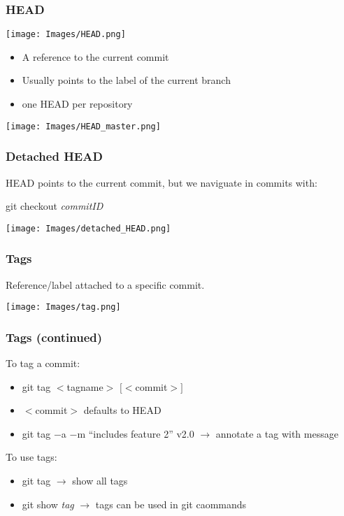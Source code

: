 \documentclass{beamer}
\begin{document}
	\begin{frame}[plain]
		\frametitle{HEAD}
		\begin{center}
			\texttt{[image: Images/HEAD.png]}
		\end{center}

		\begin{itemize}
			\item A reference to the current commit 
			\item Usually points to the label of the current branch
			\item one HEAD per repository
		\end{itemize}
		
		\begin{center}
			\texttt{[image: Images/HEAD\_master.png]}
		\end{center}
	\end{frame}

	\begin{frame}[plain]
		\frametitle{Detached HEAD}
		HEAD points to the current commit, but we naviguate in commits with:
		\begin{center}
			git checkout \textit{commitID}
		\end{center}
		\begin{center}
			\texttt{[image: Images/detached\_HEAD.png]}
		\end{center}
	
	\end{frame}

	\begin{frame}[plain]
		\frametitle{Tags}
		Reference/label attached to a specific commit.
		\begin{center}
			\texttt{[image: Images/tag.png]}
		\end{center}
		
	\end{frame}

	\begin{frame}[plain]
		\frametitle{Tags (continued)}
		
		To tag a commit:
		\begin{itemize}
			\item git tag $<$tagname$>$ $[<$commit$>]$
			\item $<$commit$>$ defaults to HEAD
			\item git tag $-$a $-$m ``includes feature 2'' v2.0 $\rightarrow$ annotate a tag with message
		\end{itemize}
		To use tags:
		\begin{itemize}
			\item git tag $\rightarrow$ show all tags
			\item git show \textit{tag} $\rightarrow$ tags can be used in git caommands
		\end{itemize}
	\end{frame}
\end{document}
